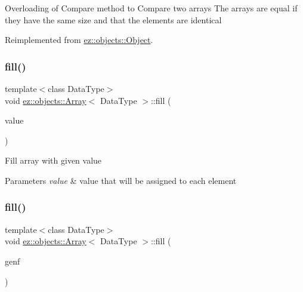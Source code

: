 Overloading of Compare method to Compare two arrays The arrays are equal if they have the same size and that the elements are identical 

Reimplemented from \hyperlink{classez_1_1objects_1_1Object_aca311d389dffa204e425463145f4e1e6}{ez\+::objects\+::\+Object}.

\mbox{\label{classez_1_1objects_1_1Array_a5ba81305951bfdef7454b3d3f11fc9d9}} 
\subsubsection{\texorpdfstring{fill()}{fill()}\hspace{0.1cm}{\footnotesize\ttfamily [1/2]}}
{\footnotesize\ttfamily template$<$class Data\+Type$>$ \\
void \hyperlink{classez_1_1objects_1_1Array}{ez\+::objects\+::\+Array}$<$ Data\+Type $>$\+::fill (\begin{DoxyParamCaption}\item[{Data\+Type}]{value }\end{DoxyParamCaption})\hspace{0.3cm}{\ttfamily [inline]}}

Fill array with given value 
\begin{DoxyParams}{Parameters}
{\em value} & value that will be assigned to each element \\
\hline
\end{DoxyParams}
\mbox{\label{classez_1_1objects_1_1Array_aebeb0faa252f89e996f0b3a7250fa20b}} 
\subsubsection{\texorpdfstring{fill()}{fill()}\hspace{0.1cm}{\footnotesize\ttfamily [2/2]}}
{\footnotesize\ttfamily template$<$class Data\+Type$>$ \\
void \hyperlink{classez_1_1objects_1_1Array}{ez\+::objects\+::\+Array}$<$ Data\+Type $>$\+::fill (\begin{DoxyParamCaption}\item[{Data\+Type($\ast$)()}]{genf }\end{DoxyParamCaption})\hspace{0.3cm}{\ttfamily [inline]}}

